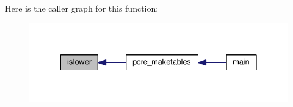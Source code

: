 Here is the caller graph for this function\+:
\nopagebreak
\begin{figure}[H]
\begin{center}
\leavevmode
\includegraphics[width=328pt]{README_8txt_ad71ae719aeb3f56d11fec83b8bdd7bf5_icgraph}
\end{center}
\end{figure}


